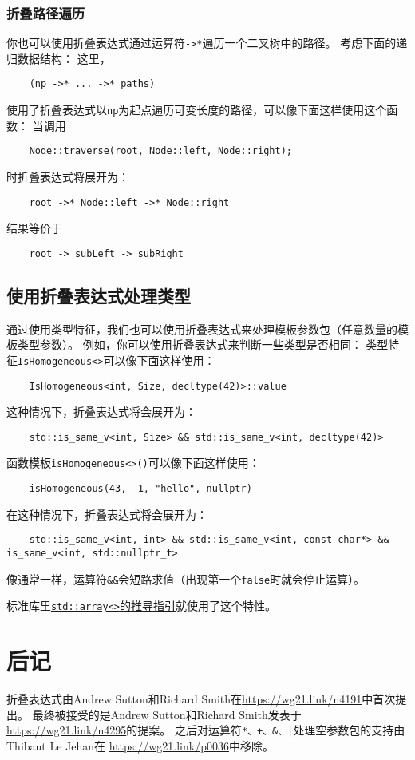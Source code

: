 \subsubsection{折叠路径遍历}
你也可以使用折叠表达式通过运算符\texttt{->*}遍历一个二叉树中的路径。
考虑下面的递归数据结构：
这里，
\begin{lstlisting}
    (np ->* ... ->* paths)
\end{lstlisting}
使用了折叠表达式以\texttt{np}为起点遍历可变长度的路径，可以像下面这样使用这个函数：
当调用
\begin{lstlisting}
    Node::traverse(root, Node::left, Node::right);
\end{lstlisting}
时折叠表达式将展开为：
\begin{lstlisting}
    root ->* Node::left ->* Node::right
\end{lstlisting}
结果等价于
\begin{lstlisting}
    root -> subLeft -> subRight
\end{lstlisting}

\subsection{使用折叠表达式处理类型}
通过使用类型特征，我们也可以使用折叠表达式来处理模板参数包（任意数量的模板类型参数）。
例如，你可以使用折叠表达式来判断一些类型是否相同：
类型特征\texttt{IsHomogeneous<>}可以像下面这样使用：
\begin{lstlisting}
    IsHomogeneous<int, Size, decltype(42)>::value
\end{lstlisting}
这种情况下，折叠表达式将会展开为：
\begin{lstlisting}
    std::is_same_v<int, Size> && std::is_same_v<int, decltype(42)>
\end{lstlisting}
函数模板\texttt{isHomogeneous<>()}可以像下面这样使用：
\begin{lstlisting}
    isHomogeneous(43, -1, "hello", nullptr)
\end{lstlisting}
在这种情况下，折叠表达式将会展开为：
\begin{lstlisting}
    std::is_same_v<int, int> && std::is_same_v<int, const char*> && is_same_v<int, std::nullptr_t>
\end{lstlisting}
像通常一样，运算符\texttt{\&\&}会短路求值（出现第一个\texttt{false}时就会停止运算）。

标准库里\hyperref[ch9.2.6.3]{\texttt{std::array<>}的推导指引}就使用了这个特性。

\section{后记}
折叠表达式由Andrew Sutton和Richard Smith在\url{https://wg21.link/n4191}中首次提出。
最终被接受的是Andrew Sutton和Richard Smith发表于\url{https://wg21.link/n4295}的提案。
之后对运算符\texttt{*、+、\&、|}处理空参数包的支持由Thibaut Le Jehan在
\url{https://wg21.link/p0036}中移除。
